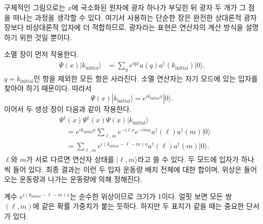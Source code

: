 구체적인 그림으로는 \(x\)에 국소화된 원자에 광자 하나가 부딪힌 뒤 광자 두 개가 그 점을 떠나는 과정을 생각할 수 있다. 여기서 사용하는 단순한 장은 완전한 상대론적 광자장보다 비상대론적 입자에 더 적합하므로, 광자라는 표현은 연산자의 계산 방식을 설명하기 위한 것일 뿐이다.

소멸 장이 먼저 작용한다.
\begin{align}
\Psi(x)|k_{\mathrm{initial}}\rangle
&=\sum_q e^{iqx}a(q)a^\dagger(k_{\mathrm{initial}})|0\rangle.
\end{align}
\(q=k_{\mathrm{initial}}\)인 항을 제외한 모든 항은 사라진다. 소멸 연산자는 자기 모드에 있는 입자를 찾아야 하기 때문이다. 따라서
\begin{equation}
\Psi(x)|k_{\mathrm{initial}}\rangle
=e^{ik_{\mathrm{initial}}x}|0\rangle.
\end{equation}
이어서 두 생성 장이 다음과 같이 작용한다.
\begin{align}
&\Psi^\dagger(x)\Psi^\dagger(x)\Psi(x)
|k_{\mathrm{initial}}\rangle
\\
&\quad=
e^{ik_{\mathrm{initial}}x}
\sum_{\ell,m}
e^{-i\ell x}e^{-imx}
a^\dagger(\ell)a^\dagger(m)|0\rangle
\\
&\quad=
\sum_{\ell,m}
e^{i(k_{\mathrm{initial}}-\ell-m)x}
a^\dagger(\ell)a^\dagger(m)|0\rangle.
\end{align}
\(\ell\)와 \(m\)가 서로 다르면 연산자 상태를 \(|\ell,m\rangle\)라고 쓸 수 있다. 두 모드에 입자가 하나씩 들어 있다. 최종 결과는 이런 두 입자 운동량 배치 전체에 대한 합이며, 위상은 들어오는 운동량과 나가는 운동량에 의해 정해진다.

\begin{classroomqa}
\end{classroomqa}

\begin{classroomqa}\end{classroomqa}

계수 \(e^{i(k_{\mathrm{initial}}-\ell-m)x}\)는 순수한 위상이므로 크기가 1이다. 얼핏 보면 모든 쌍 \((\ell,m)\)에 같은 확률 가중치가 붙는 듯하다. 하지만 두 표지가 같을 때는 중요한 단서가 있다.

